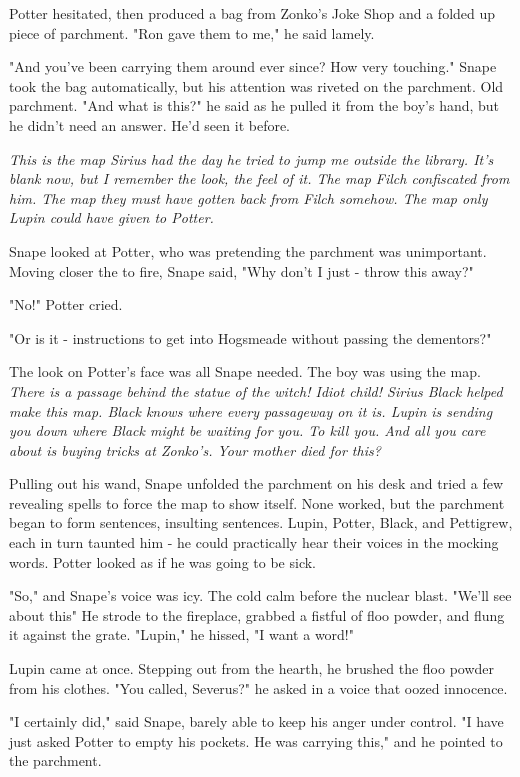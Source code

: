Potter hesitated, then produced a bag from Zonko's Joke Shop and a folded up piece of parchment. "Ron gave them to me," he said lamely.

"And you've been carrying them around ever since? How very touching." Snape took the bag automatically, but his attention was riveted on the parchment. Old parchment. "And what is this?" he said as he pulled it from the boy's hand, but he didn't need an answer. He'd seen it before.

\emph{This is the map Sirius had the day he tried to jump me outside the library. It's blank now, but I remember the look, the feel of it. The map Filch confiscated from him. The map they must have gotten back from Filch somehow. The map only Lupin could have given to Potter.}

Snape looked at Potter, who was pretending the parchment was unimportant. Moving closer the to fire, Snape said, "Why don't I just - throw this away?"

"No!" Potter cried.

"Or is it - instructions to get into Hogsmeade without passing the dementors?"

The look on Potter's face was all Snape needed. The boy was using the map. \emph{There is a passage behind the statue of the witch! Idiot child! Sirius Black helped make this map. Black knows where every passageway on it is. Lupin is sending you down where Black might be waiting for you. To kill you. And all you care about is buying tricks at Zonko's. Your mother died for this?}

Pulling out his wand, Snape unfolded the parchment on his desk and tried a few revealing spells to force the map to show itself. None worked, but the parchment began to form sentences, insulting sentences. Lupin, Potter, Black, and Pettigrew, each in turn taunted him - he could practically hear their voices in the mocking words. Potter looked as if he was going to be sick.

"So," and Snape's voice was icy. The cold calm before the nuclear blast. "We'll see about this{\el}" He strode to the fireplace, grabbed a fistful of floo powder, and flung it against the grate. "Lupin," he hissed, "I want a word!"

Lupin came at once. Stepping out from the hearth, he brushed the floo powder from his clothes. "You called, Severus?" he asked in a voice that oozed innocence.

"I certainly did," said Snape, barely able to keep his anger under control. "I have just asked Potter to empty his pockets. He was carrying this," and he pointed to the parchment.

